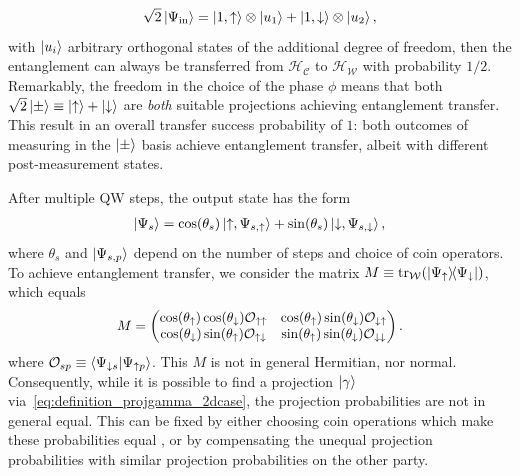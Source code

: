 \documentclass[
	aps, pra,
	superscriptaddress, twocolumn,
	floatfix,
	10pt
]{revtex4-1}
\newcommand{\on}[1]{\operatorname{#1}}
\newcommand{\parTitle}[1]{\noindent{\color{Mahogany}(\emph{#1})}}
\newcommand{\calC}{{\mathcal{C}}}
\newcommand{\calH}{{\mathcal{H}}}
\newcommand{\calO}{{\mathcal{O}}}
\newcommand{\calW}{{\mathcal{W}}}
\begin{document}
\begin{equation}
	\sqrt2\ket*{\Psi_{\on{in}}} = \ket{1,\uparrow} \otimes \ket{u_1} + \ket{1,\downarrow}\otimes \ket{u_2},
\end{equation}
with $\ket{u_i}$ arbitrary orthogonal states of the additional degree of freedom,
then the entanglement can always be transferred from $\calH_{\calC}$ to $\calH_{\calW}$ with probability $1/2$.
Remarkably, the freedom in the choice of the phase $\phi$ means that both $\sqrt2\ket\pm\equiv \ket\uparrow+\ket\downarrow$ are \emph{both} suitable projections achieving entanglement transfer.
This result in an overall transfer success probability of $1$: both outcomes of measuring in the $\ket\pm$ basis achieve entanglement transfer, albeit with different post-measurement states.

\parTitle{Multiple steps}
After multiple QW steps, the output state has the form
\begin{equation}
\begin{aligned}
	\ket{\Psi_s} =
	\cos(\theta_s) \ket{\uparrow,\Psi_{s,\uparrow}} +
	\sin(\theta_s) \ket{\downarrow,\Psi_{s,\downarrow}},
\end{aligned}
\end{equation}
where $\theta_s$ and $\ket{\Psi_{s,p}}$ depend on the number of steps and choice of coin operators.
To achieve entanglement transfer, we consider the matrix
$M\equiv \tr_{\calW}(\ketbra{\Psi_\uparrow}{\Psi_\downarrow})$,
which equals
\begin{equation}\scalebox{0.97}{$\displaystyle
	M = \begin{pmatrix}
		\cos(\theta_\uparrow)\cos(\theta_\downarrow) \calO_{\uparrow\uparrow} &
		\cos(\theta_\uparrow)\sin(\theta_{\downarrow}) \calO_{\downarrow\uparrow} \\
		\cos(\theta_\downarrow)\sin(\theta_{\uparrow}) \calO_{\uparrow\downarrow} &
		\sin(\theta_\uparrow)\sin(\theta_\downarrow) \calO_{\downarrow\downarrow}
	\end{pmatrix}.
$}\end{equation}
where
$\calO_{sp}\equiv\braket{\Psi_{\downarrow s}}{\Psi_{\uparrow p}}$.
This $M$ is not in general Hermitian, nor normal. Consequently, while it is possible to find a projection $\ket\gamma$ via~\cref{eq:definition_projgamma_2dcase}, the projection probabilities are not in general equal.
This can be fixed by either choosing coin operations which make these probabilities equal , or by compensating the unequal projection probabilities with similar projection probabilities on the other party.
\end{document}
